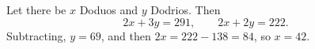 Let there be $x$ Doduos and $y$ Dodrios. Then
\[
2x+3y=291,\qquad 2x+2y=222 .
\]
Subtracting, $y=69$, and then $2x=222-138=84$, so $x=\boxed{42}$.
